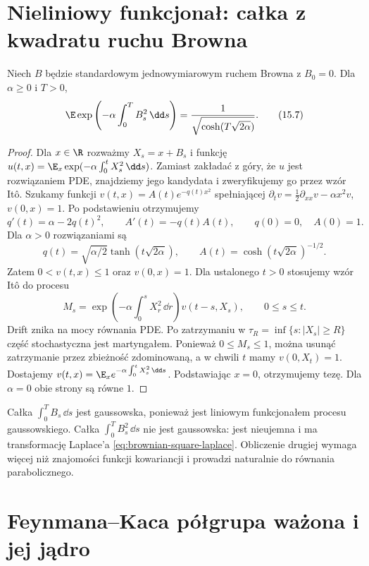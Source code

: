 \section{Nieliniowy funkcjonał: całka z kwadratu ruchu Browna}

\begin{twierdzenie}
\label{th:brownian-square-laplace}
Niech $B$ będzie standardowym jednowymiarowym
ruchem Browna z $B_0=0$. Dla $\alpha\ge0$ i $T>0$,
\[
 \E\exp\left(-\alpha\int_0^T B_s^2\,\dd s\right)
 =\frac1{\sqrt{\cosh(T\sqrt{2\alpha})}}.
\tag{15.7}\label{eq:brownian-square-laplace}
\]
\end{twierdzenie}
\begin{proof}
Dla $x\in\R$ rozważmy $X_s=x+B_s$ i funkcję
$u(t,x)=\E_x\exp(-\alpha\int_0^tX_s^2\,\dd s)$.
Zamiast zakładać z góry, że $u$ jest rozwiązaniem PDE,
znajdziemy jego kandydata i zweryfikujemy go przez
wzór Itô. Szukamy funkcji $v(t,x)=A(t)e^{-q(t)x^2}$
spełniającej
$\partial_tv=\tfrac12\partial_{xx}v-\alpha x^2v$,
$v(0,x)=1$. Po podstawieniu otrzymujemy
\[
 q'(t)=\alpha-2q(t)^2,\qquad
 A'(t)=-q(t)A(t),\qquad q(0)=0,\quad A(0)=1.
\]
Dla $\alpha>0$ rozwiązaniami są
\[
 q(t)=\sqrt{\alpha/2}\tanh(t\sqrt{2\alpha}),\qquad
 A(t)=\cosh(t\sqrt{2\alpha})^{-1/2}.
\]
Zatem $0<v(t,x)\le1$ oraz $v(0,x)=1$.
Dla ustalonego $t>0$ stosujemy wzór Itô do procesu
\[
 M_s=\exp\left(-\alpha\int_0^sX_r^2\,\dd r\right)
 v(t-s,X_s),\qquad 0\le s\le t.
\]
Drift znika na mocy równania PDE. Po zatrzymaniu w
$\tau_R=\inf\{s:|X_s|\ge R\}$ część stochastyczna
jest martyngałem. Ponieważ $0\le M_s\le1$, można
usunąć zatrzymanie przez zbieżność zdominowaną,
a w chwili $t$ mamy $v(0,X_t)=1$. Dostajemy
$v(t,x)=\E_xe^{-\alpha\int_0^tX_s^2\,\dd s}$.
Podstawiając $x=0$, otrzymujemy tezę. Dla
$\alpha=0$ obie strony są równe $1$.
\end{proof}

\begin{uwaga}
Całka $\int_0^T B_s\,\dd s$ jest gaussowska,
ponieważ jest liniowym funkcjonałem procesu
gaussowskiego. Całka $\int_0^T B_s^2\,\dd s$
nie jest gaussowska: jest nieujemna i ma transformację
Laplace'a \eqref{eq:brownian-square-laplace}.
Obliczenie drugiej wymaga więcej niż znajomości
funkcji kowariancji i prowadzi naturalnie do
równania parabolicznego.
\end{uwaga}

\section{Feynmana--Kaca półgrupa ważona i jej jądro}

